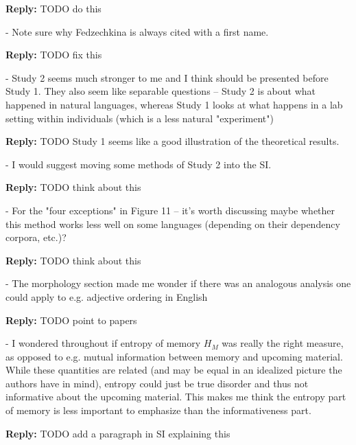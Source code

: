 \documentclass{article}[11pt,a4paper,oneside]
\newenvironment{reply}
  {\par\medskip
   \color{blue}%
   \begin{framed}
   \textbf{Reply: }\ignorespaces}
 {\end{framed}
  \medskip}
\begin{document}
\begin{reply}
	TODO do this
\end{reply}

- Note sure why Fedzechkina is always cited with a first name.

\begin{reply}
	TODO fix this
\end{reply}

- Study 2 seems much stronger to me and I think should be presented before Study 1. They also seem like separable questions -- Study 2 is about what happened in natural languages, whereas Study 1 looks at what happens in a lab setting within individuals (which is a less natural "experiment")

\begin{reply}
	TODO Study 1 seems like a good illustration of the theoretical results.
\end{reply}

- I would suggest moving some methods of Study 2 into the SI.

\begin{reply}
	TODO think about this
\end{reply}

- For the "four exceptions" in Figure 11 -- it's worth discussing maybe whether this method works less well on some languages (depending on their dependency corpora, etc.)?

\begin{reply}
	TODO think about this
\end{reply}

- The morphology section made me wonder if there was an analogous analysis one could apply to e.g. adjective ordering in English

\begin{reply}
	TODO point to papers
\end{reply}

- I wondered throughout if entropy of memory $H_M$ was really the right measure, as opposed to e.g. mutual information between memory and upcoming material. While these quantities are related (and may be equal in an idealized picture the authors have in mind), entropy could just be true disorder and thus not informative about the upcoming material. This makes me think the entropy part of memory is less important to emphasize than the informativeness part.

\begin{reply}
	TODO add a paragraph in SI explaining this
\end{reply}
\end{document}
